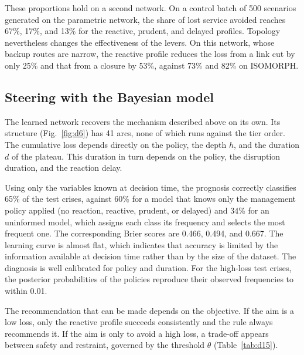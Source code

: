 These proportions hold on a second network. On a control batch of 500 scenarios generated on the parametric network, the share of lost service avoided reaches 67\%, 17\%, and 13\% for the reactive, prudent, and delayed profiles. Topology nevertheless changes the effectiveness of the levers. On this network, whose backup routes are narrow, the reactive profile reduces the loss from a link cut by only 25\% and that from a closure by 53\%, against 73\% and 82\% on ISOMORPH.

\subsection{Steering with the Bayesian model}
\label{sec:4.3}

The learned network recovers the mechanism described above on its own. Its structure (Fig.~\ref{fig:d6}) has 41 arcs, none of which runs against the tier order. The cumulative loss depends directly on the policy, the depth $h$, and the duration $d$ of the plateau. This duration in turn depends on the policy, the disruption duration, and the reaction delay.

\begin{center}
\resizebox{\textwidth}{!}{}
\label{fig:d6}
\end{center}

Using only the variables known at decision time, the prognosis correctly classifies 65\% of the test crises, against 60\% for a model that knows only the management policy applied (no reaction, reactive, prudent, or delayed) and 34\% for an uninformed model, which assigns each class its frequency and selects the most frequent one. The corresponding Brier scores are 0.466, 0.494, and 0.667. The learning curve is almost flat, which indicates that accuracy is limited by the information available at decision time rather than by the size of the dataset. The diagnosis is well calibrated for policy and duration. For the high-loss test crises, the posterior probabilities of the policies reproduce their observed frequencies to within 0.01.

The recommendation that can be made depends on the objective. If the aim is a low loss, only the reactive profile succeeds consistently and the rule always recommends it. If the aim is only to avoid a high loss, a trade-off appears between safety and restraint, governed by the threshold $\theta$ (Table~\ref{tab:d15}).

